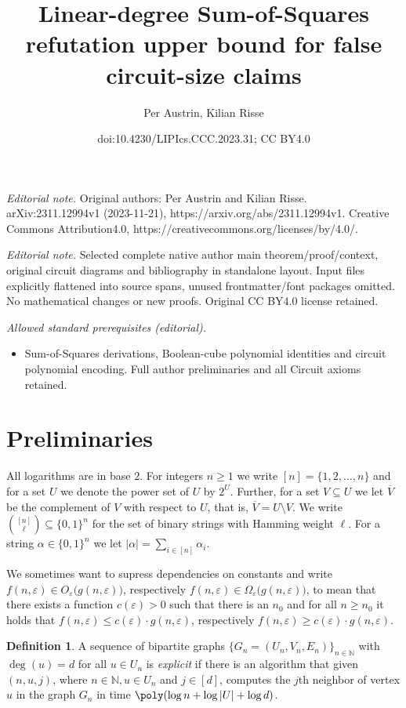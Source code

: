 \documentclass[10pt,a4paper]{article}
\title{Linear-degree Sum-of-Squares refutation upper bound for false circuit-size claims}
\author{Per Austrin, Kilian Risse}
\date{doi:10.4230/LIPIcs.CCC.2023.31; CC BY4.0}
\theoremstyle{plain}
\theoremstyle{remark}
\theoremstyle{definition}
\newtheorem{definition}[theorem]{Definition}
\newcommand{\eps}{\varepsilon}
\newcommand{\set}[1]{\{#1\}}
\newcommand{\N}{\mathbb{N}}
\begin{document}
\maketitle
\setcounter{section}{1}
\noindent\textit{Editorial note.} Original authors: Per Austrin and Kilian Risse. arXiv:2311.12994v1 (2023-11-21), https://arxiv.org/abs/2311.12994v1. Creative Commons Attribution4.0, https://creativecommons.org/licenses/by/4.0/.\par\medskip
\noindent\textit{Editorial note.} Selected complete native author main theorem/proof/context, original circuit diagrams and bibliography in standalone layout. Input files explicitly flattened into source spans, unused frontmatter/font packages omitted. No mathematical changes or new proofs. Original CC BY4.0 license retained.\par\medskip
\noindent\textit{Allowed standard prerequisites (editorial).}\begin{itemize}
\item Sum-of-Squares derivations, Boolean-cube polynomial identities and circuit polynomial encoding. Full author preliminaries and all Circuit axioms retained.
\end{itemize}\medskip
\section{Preliminaries}
\label{sec:preliminaries}

All logarithms are in base $2$.  For integers $n \ge 1$ we write
$[n] = \set{1, 2, \ldots, n}$ and for a set $U$ we denote the power
set of $U$ by $2^{U}$. Further, for a set $V \subseteq U$ we let
$\overline V$ be the complement of $V$ with respect to $U$, that is,
$\overline V = U \setminus V$. We write
$\binom{[n]}{\ell} \subseteq \set{0,1}^n$ for the set of binary
strings with Hamming weight $\ell$. For a string
$\alpha \in \set{0,1}^n$ we let
$|\alpha| = \sum_{i \in [n]} \alpha_i$.

We sometimes want to supress dependencies on constants and write
$f(n, \eps) \in O_\eps\big(g(n, \eps)\big)$, respectively
$f(n, \eps) \in \Omega_\eps\big(g(n, \eps)\big)$, to mean that there
exists a function $c(\eps) > 0$ such that there is an $n_0$ and for all
$n \ge n_0$ it holds that $f(n, \eps) \le c(\eps) \cdot g(n, \eps)$,
respectively $f(n, \eps) \ge c(\eps)\cdot g(n, \eps)$.

\begin{definition}\label{def:explicit}
  A sequence of bipartite graphs $\set{G_n=(U_n, V_n, E_n)}_{n\in \N}$
  with $\deg(u) =d$ for all $u \in U_n$ is \emph{explicit} if there is
  an algorithm that given $(n, u, j)$, where $n \in \N, u \in U_n$ and
  $j\in [d]$, computes the $j$th neighbor of vertex $u$ in the graph
  $G_n$ in time $\poly(\log n + \log |U| + \log d)$.
\end{definition}
\end{document}
